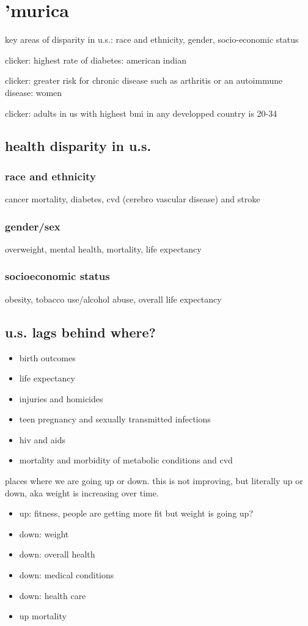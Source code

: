 \documentclass[letterpaper]{article}
\begin{document}
\section*{'murica}
key areas of disparity  in u.s.: race and ethnicity, gender, socio-economic status

clicker: highest rate of diabetes: american indian

clicker: greater risk for chronic disease such as arthritis or an autoimmune disease: women

clicker: adults in us with highest bmi in any developped country is 20-34

\subsection*{health disparity in u.s.}
\subsubsection*{race and ethnicity}
cancer mortality, diabetes, cvd (cerebro vascular disease) and stroke
\subsubsection*{gender/sex}
overweight, mental health, mortality, life expectancy
\subsubsection*{socioeconomic status}
obesity, tobacco use/alcohol abuse, overall life expectancy

\subsection*{u.s. lags behind where?}
\begin{itemize}
\item
birth outcomes
\item
life expectancy
\item
injuries and homicides
\item
teen  pregnancy and sexually transmitted infections
\item
hiv and aids
\item
mortality and morbidity of metabolic conditions and cvd
\end{itemize}
places where we are going up or down. this is not improving, but literally up or down, aka weight is increasing over time.
\begin{itemize}
\item
up: fitness, people are getting more fit but weight is going up?
\item
down: weight
\item
down: overall health
\item
down: medical conditions
\item
down: health care
\item
up mortality
\end{itemize}
\end{document}
